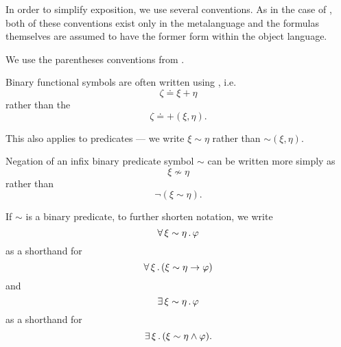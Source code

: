 \begin{remark}\label{rem:first_order_formula_conventions}
  In order to simplify exposition, we use several conventions. As in the case of , both of these conventions exist only in the metalanguage and the formulas themselves are assumed to have the former form within the object language.
  \begin{thmenum}
     We use the parentheses conventions from .

     Binary functional symbols are often written using , i.e.
    \begin{equation*}
      \zeta \doteq \xi + \eta
    \end{equation*}
    rather than the 
    \begin{equation*}
      \zeta \doteq +(\xi, \eta).
    \end{equation*}

    This also applies to predicates --- we write \( \xi \sim \eta \) rather than \( \sim(\xi, \eta) \).

     Negation of an infix binary predicate symbol \( \sim \) can be written more simply as
    \begin{equation*}
      \xi \not\sim \eta
    \end{equation*}
    rather than
    \begin{equation*}
      \neg(\xi \sim \eta).
    \end{equation*}

     If \( \sim \) is a binary predicate, to further shorten notation, we write
    \begin{equation*}
      \forall \thinspace \xi \sim \eta \thinspace . \thinspace \varphi
    \end{equation*}
    as a shorthand for
    \begin{equation*}
      \forall \thinspace \xi \thinspace . \thinspace (\xi \sim \eta \rightarrow \varphi)
    \end{equation*}
    and
    \begin{equation*}
      \exists \thinspace \xi \sim \eta \thinspace . \thinspace \varphi
    \end{equation*}
    as a shorthand for
    \begin{equation*}
      \exists \thinspace \xi \thinspace . \thinspace (\xi \sim \eta \wedge \varphi).
    \end{equation*}


\end{thmenum}
\end{remark}
